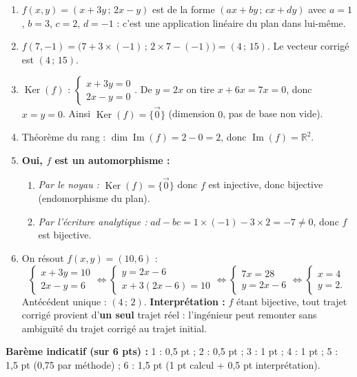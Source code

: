 \documentclass[11pt]{article}
\begin{document}
\begin{corrige}
\begin{enumerate}
\item $f(x,y)=(x+3y\,;\,2x-y)$ est de la forme $(ax+by\,;\,cx+dy)$ avec $a=1$, $b=3$, $c=2$, $d=-1$ : c'est une application linéaire du plan dans lui-même.
\item $f(7,-1)=\bigl(7+3\times(-1)\,;\,2\times 7-(-1)\bigr)=(4\,;\,15)$. Le vecteur corrigé est $(4\,;\,15)$.
\item $\operatorname{Ker}(f)$ : $\begin{cases} x+3y=0 \\ 2x-y=0 \end{cases}$. De $y=2x$ on tire $x+6x=7x=0$, donc $x=y=0$. Ainsi $\operatorname{Ker}(f)=\{\vec{0}\}$ (dimension $0$, pas de base non vide).
\item Théorème du rang : $\dim\operatorname{Im}(f)=2-0=2$, donc $\operatorname{Im}(f)=\mathbb{R}^2$.
\item \textbf{Oui, $f$ est un automorphisme :}
\begin{enumerate}
\item \emph{Par le noyau :} $\operatorname{Ker}(f)=\{\vec{0}\}$ donc $f$ est injective, donc bijective (endomorphisme du plan).
\item \emph{Par l'écriture analytique :} $ad-bc=1\times(-1)-3\times 2=-7\neq 0$, donc $f$ est bijective.
\end{enumerate}
\item On résout $f(x,y)=(10,6)$ :
\[ \begin{cases} x+3y=10 \\ 2x-y=6 \end{cases} \iff \begin{cases} y=2x-6 \\ x+3(2x-6)=10 \end{cases} \iff \begin{cases} 7x=28 \\ y=2x-6 \end{cases} \iff \begin{cases} x=4 \\ y=2. \end{cases} \]
Antécédent unique : $(4\,;\,2)$. \textbf{Interprétation :} $f$ étant bijective, tout trajet corrigé provient d'\textbf{un seul} trajet réel : l'ingénieur peut remonter sans ambiguïté du trajet corrigé au trajet initial.
\end{enumerate}

\textbf{Barème indicatif (sur 6 pts) :} 1 : 0,5 pt ; 2 : 0,5 pt ; 3 : 1 pt ; 4 : 1 pt ; 5 : 1,5 pt (0,75 par méthode) ; 6 : 1,5 pt (1 pt calcul + 0,5 pt interprétation).
\end{corrige}
\end{document}
